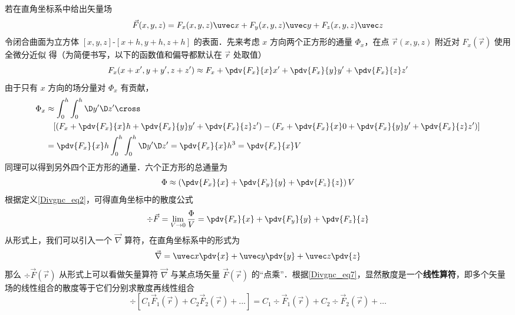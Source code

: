 若在直角坐标系中给出矢量场
\begin{equation}
\vec F(x,y,z) = {F_x}(x,y,z)\uvec x + {F_y}(x,y,z)\uvec y + {F_z}(x,y,z)\uvec z
\end{equation}
令闭合曲面为立方体 $[x,y,z]$-$[x+h,y+h,z+h]$ 的表面．先来考虑 $x$ 方向两个正方形的通量 ${\Phi _x}$，在点 $\vec r (x,y,z)$ 附近对 $F_x(\vec r)$ 使用全微分近似 得（为简便书写，以下的函数值和偏导都默认在 $\vec r$ 处取值）
\begin{equation}
{F_x}(x + x',y + y',z + z') \approx {F_x} + \pdv{F_x}{x}x' + \pdv{F_x}{y}y' + \pdv{F_x}{z}z'
\end{equation}
由于只有 $x$ 方向的场分量对 $\Phi_x$ 有贡献，
\begin{equation}\begin{aligned}
  {\Phi _x} &\approx \int_0^h {\int_0^h {\D y'\D z'} }  \cross \\
  &\phantom{= }\left[ {\left( F_x + \pdv{F_x}{x}h + \pdv{F_x}{y}y' + \pdv{F_x}{z}z' \right) - \left( {{F_x} + \pdv{F_x}{x}0 + \pdv{F_x}{y}y' + \pdv{F_x}{z}z'} \right)} \right] \\
   &= \pdv{F_x}{x}h\int_0^h {\int_0^h {\D y'\D z'} }  = \pdv{F_x}{x}h^3 = \pdv{F_x}{x}V
\end{aligned} \end{equation}
同理可以得到另外四个正方形的通量．六个正方形的总通量为
\begin{equation}
\Phi  \approx \left( \pdv{F_x}{x} + \pdv{F_y}{y} + \pdv{F_z}{z} \right)V
\end{equation}
根据定义\autoref{Divgnc_eq2}，可得直角坐标中的散度公式
\begin{equation}\label{Divgnc_eq7}
\div \vec F = \mathop {\lim }\limits_{V \to 0} \frac{\Phi }{V} = \pdv{F_x}{x} + \pdv{F_y}{y} + \pdv{F_z}{z}
\end{equation}
从形式上，我们可以引入一个 $\vec\nabla$ 算符，在直角坐标系中的形式为
\begin{equation}
\vec\nabla  = \uvec x\pdv{x} + \uvec y\pdv{y} + \uvec z\pdv{z}
\end{equation}
那么 $\div \vec F(\vec r)$ 从形式上可以看做矢量算符 $\vec\nabla$ 与某点场矢量 $\vec F(\vec r)$ 的“点乘”．根据\autoref{Divgnc_eq7}，显然散度是一个\textbf{线性算符}，即多个矢量场的线性组合的散度等于它们分别求散度再线性组合
\begin{equation}
\div [{C_1}{\vec F_1}(\vec r) + {C_2}{\vec F_2}(\vec r) + ...] = {C_1}\div {\vec F_1}(\vec r) + {C_2}\div {\vec F_2}(\vec r) + \dots
\end{equation}

